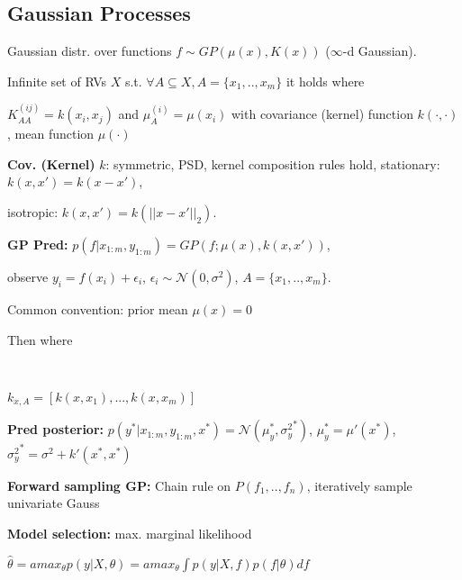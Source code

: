 \subsection*{Gaussian Processes}

Gaussian distr. over functions $f \sim GP(\mu(x),K(x))$ ($\infty$-d Gaussian). 

Infinite set of RVs $X$ s.t. $\forall A \subseteq X, A = \{ x_1,.., x_m\}$
it holds  where

$K_{AA}^{(ij)} = k(x_i, x_j)$ and $\mu_A^{(i)} = \mu(x_i)$ with covariance (kernel) function $k(\cdot, \cdot)$, mean function $\mu(\cdot)$

\textbf{Cov. (Kernel)} $k$: \; symmetric, PSD, kernel composition rules hold,
stationary: $k(x,x') = k(x - x')$,

isotropic: $k(x,x') = k(||x - x'||_2)$.

\textbf{GP Pred:} \; $p(f|x_{1:m},y_{1:m}) = GP(f; \mu(x), k(x,x'))$, 

observe $y_i = f(x_i) + \epsilon_i$, $\epsilon_i \sim \mathcal{N}(0, \sigma^2)$, \mbox{\fontsize{9}{6}\selectfont $A = \{x_1,..,x_m\}$}.

Common convention: prior mean $\mu(x) = 0$

Then  where

 \\

$k_{x,A} = [k(x, x_1),..., k(x, x_m)]$

\textbf{Pred posterior:} \; $p(y^* | x_{1:m}, y_{1:m},x^*) = \mathcal{N}(\mu_y^*, {\sigma_y^2}^*)$, $\mu_y^* = \mu'(x^*)$, \; ${\sigma_y^2}^* = \sigma^2 + k'(x^*, x^*)$

\textbf{Forward sampling GP:} \; Chain rule on $P(f_1,..,f_n)$, iteratively sample univariate Gauss

\textbf{Model selection:} \; max. marginal likelihood

$\hat{\theta} = amax_\theta p(y | X, \theta) = amax_\theta \int p(y | X,f) p(f | \theta) df$


